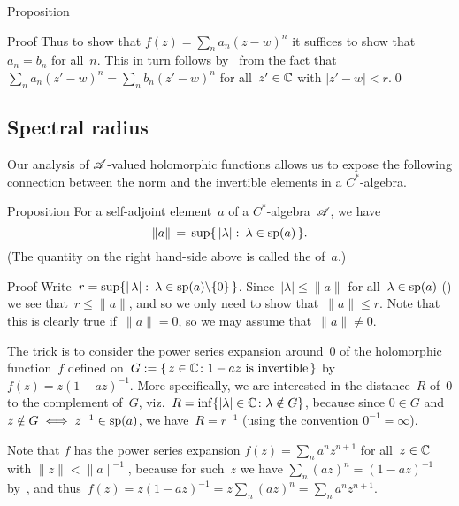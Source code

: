 \documentclass[a]{subfiles}
\begin{document}
\begin{parsec}
\begin{point}{Proposition}
\begin{point}{Proof}
Thus to show that $f(z)=\sum_n a_n (z-w)^n$
it suffices to show that~$a_n=b_n$ for all~$n$.
This in turn
follows by~ from the fact
that $\sum_n a_n (z'-w)^n
= \sum_n b_n (z'-w)^n$
for all~$z'\in \mathbb{C}$ with $\left|z'-w\right|<r$.\qed
\end{point}
\end{point}
\end{parsec}
\subsection{Spectral radius}
\begin{parsec}%
\begin{point}%
Our analysis of $\mathscr{A}$-valued
holomorphic functions
allows us to expose
the following connection
between the norm
and the invertible elements
in a $C^*$-algebra.
\end{point}
\begin{point}{Proposition}%
For a self-adjoint element~$a$ of a $C^*$-algebra~$\mathscr{A}$,
we have
\begin{equation*}
\|a\|\,=\,\sup\{\,\left|\lambda\right|\colon 
\,\lambda\in \mathrm{sp}(a)\,\}.
\end{equation*}
(The quantity on the right hand-side above
is called the  of~$a$.)
\begin{point}{Proof}%
Write~$r=
\sup\{\left|\,\lambda\right|\colon\, \lambda\in \mathrm{sp}(a)\backslash\{0\}\,\}$.
Since~$\left|\lambda\right| \leq \|a\|$
for all~$\lambda\in\mathrm{sp}(a)$
()
we see that~$r\leq \|a\|$,
and so we only need to show that~$\|a\|\leq r$. 
Note that this is clearly true if~$\|a\|=0$,
so we may assume that~$\|a\|\neq 0$.

The trick is to consider
the power series expansion
around~$0$ of the holomorphic function~$f$ defined
on~$G:=\{\,z\in \mathbb{C}\colon 1-az\text{ is invertible}\,\}$ 
by  $f(z)=z(1-az)^{-1}$.
More specifically,
we are interested in the distance~$R$
of~$0$ to the complement of~$G$,
viz.~$R= \inf\{\left|\lambda\right|\in \mathbb{C}\colon \lambda\notin G\}$,
because since $0\in G$
and $z\notin G\iff z^{-1}\in \mathrm{sp}(a)$,
we have~$R=r^{-1}$
(using the convention $0^{-1}=\infty$).

Note that $f$ has the power series expansion
$f(z) = \sum_n a^nz^{n+1}$
for all~$z\in \mathbb{C}$ with $\|z\|<\|a\|^{-1}$,
because for such~$z$
we have $\sum_n (az)^n=(1-az)^{-1}$
by~,
and thus~$f(z)=z(1-az)^{-1}=z\sum_n (az)^n = \sum_n a^nz^{n+1}$.


\end{point}
\end{point}
\end{parsec}
\end{document}
